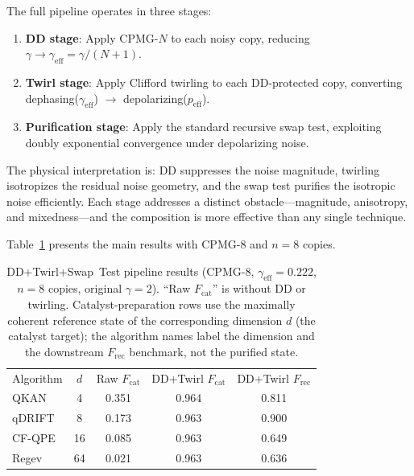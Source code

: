 \documentclass[pra,twocolumn,superscriptaddress,longbibliography,floatfix]{revtex4-2}
\begin{document}
The full pipeline operates in three stages:
\begin{enumerate}
\item \textbf{DD stage}: Apply CPMG-$N$ to each noisy copy, reducing $\gamma \to \gamma_\mathrm{eff} = \gamma/(N+1)$.
\item \textbf{Twirl stage}: Apply Clifford twirling to each DD-protected copy, converting dephasing($\gamma_\mathrm{eff}$) $\to$ depolarizing($p_\mathrm{eff}$).
\item \textbf{Purification stage}: Apply the standard recursive swap test, exploiting doubly exponential convergence under depolarizing noise.
\end{enumerate}

The physical interpretation is: DD suppresses the noise magnitude, twirling isotropizes the residual noise geometry, and the swap test purifies the isotropic noise efficiently.
Each stage addresses a distinct obstacle---magnitude, anisotropy, and mixedness---and the composition is more effective than any single technique.

Table~\ref{tab:dd_pipeline} presents the main results with CPMG-8 and $n = 8$ copies.

\begin{table}[tb]
\caption{DD+Twirl+Swap~Test pipeline results (CPMG-8, $\gamma_\mathrm{eff} = 0.222$, $n = 8$ copies, original $\gamma = 2$). ``Raw $F_\mathrm{cat}$'' is without DD or twirling. Catalyst-preparation rows use the maximally coherent reference state of the corresponding dimension $d$ (the catalyst target); the algorithm names label the dimension and the downstream $F_\mathrm{rec}$ benchmark, not the purified state.}
\label{tab:dd_pipeline}
\centering\footnotesize
\setlength{\tabcolsep}{3pt}
\begin{ruledtabular}
\begin{tabular}{lcccc}
Algorithm & $d$ & Raw $F_\mathrm{cat}$ & \makecell{DD+Twirl \\ $F_\mathrm{cat}$} & \makecell{DD+Twirl \\ $F_\mathrm{rec}$} \\
\colrule
QKAN & 4 & 0.351 & 0.964 & 0.811 \\
qDRIFT & 8 & 0.173 & 0.963 & 0.900 \\
CF-QPE & 16 & 0.085 & 0.963 & 0.649 \\
Regev & 64 & 0.021 & 0.963 & 0.636 \\
\end{tabular}
\end{ruledtabular}
\end{table}
\end{document}
